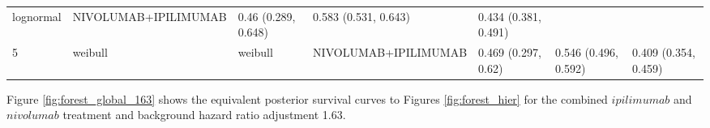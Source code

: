 \documentclass[
]{article}
\begin{document}
\begin{longtable}[]{@{}lllllll@{}}
\begin{minipage}[t]{0.09\columnwidth}
lognormal\strut
\end{minipage} & \begin{minipage}[t]{0.15\columnwidth}\raggedright
NIVOLUMAB+IPILIMUMAB\strut
\end{minipage} & \begin{minipage}[t]{0.15\columnwidth}\raggedright
0.46 (0.289, 0.648)\strut
\end{minipage} & \begin{minipage}[t]{0.15\columnwidth}\raggedright
0.583 (0.531, 0.643)\strut
\end{minipage} & \begin{minipage}[t]{0.15\columnwidth}\raggedright
0.434 (0.381, 0.491)\strut
\end{minipage}\tabularnewline
\begin{minipage}[t]{0.02\columnwidth}\raggedright
5\strut
\end{minipage} & \begin{minipage}[t]{0.09\columnwidth}\raggedright
weibull\strut
\end{minipage} & \begin{minipage}[t]{0.09\columnwidth}\raggedright
weibull\strut
\end{minipage} & \begin{minipage}[t]{0.15\columnwidth}\raggedright
NIVOLUMAB+IPILIMUMAB\strut
\end{minipage} & \begin{minipage}[t]{0.15\columnwidth}\raggedright
0.469 (0.297, 0.62)\strut
\end{minipage} & \begin{minipage}[t]{0.15\columnwidth}\raggedright
0.546 (0.496, 0.592)\strut
\end{minipage} & \begin{minipage}[t]{0.15\columnwidth}\raggedright
0.409 (0.354, 0.459)\strut
\end{minipage}\tabularnewline
\bottomrule
\end{longtable}

Figure \ref{fig:forest_global_163} shows the equivalent posterior
survival curves to Figures \ref{fig:forest_hier} for the combined
\(ipilimumab\) and \(nivolumab\) treatment and background hazard ratio
adjustment 1.63.
\end{document}
